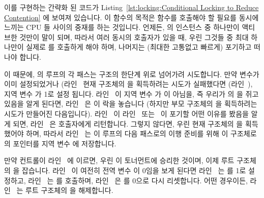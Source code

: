 이를 구현하는 간략화 된 코드가
Listing~\ref{lst:locking:Conditional Locking to Reduce Contention} 에 보여져
있습니다.
이 함수의 목적은  함수를 호출해야 할 필요를
동시에 느끼는 CPU 들 사이의 중재를 하는 것입니다.
언제든,  의 인스턴스 중 하나만이 액티브한 것만이
말이 되며, 따라서 여러 동시의 호출자가 있을 때, 우린 그것들 중 최대 하나만이
실제로  를 호출하게 해야 하며, 나머지는 (최대한
고통없고 빠르게) 포기하고 떠나야 합니다.

\begin{fcvref}
이 때문에,  의 루프의 각 패스는 
구조의 한단계 위로 넘어가려 시도합니다.
만약  변수가 이미 설정되었거나 (라인~ 현재
 구조체의  을 획득하려는 시도가 실패했다면
(라인~), 지역 변수  가 1로 설정 됩니다.
라인~ 이 지역 변수  가  이 아님을, 즉
우리가  의  을 쥐고 있음을 알게 된다면,
라인~ 은 이 락을 놓습니다 (하지만 부모  구조체의
 을 획득하려는 시도가 만들어진 다음입니다).
라인~ 이 라인~ 또는~ 이 포기할
어떤 이유를 봤음을 알게 되면, 라인~ 은 호출자에게 리턴합니다.
그렇지 않다면, 우린 현재  구조체의  을 획득했어야
하며, 따라서 라인~ 는 이 루프의 다음 패스로의 이행 준비를 위해 이
구조체로의 포인터를 지역 변수  에 저장합니다.

만약 컨트롤이 라인~ 에 이르면, 우린 이 토너먼트에 승리한
것이며, 이제 루트  구조체의  을 잡습니다.
라인~ 이 여전히 전역 변수  이 0임을 보게
된다면 라인~ 는  를 1로 설정하고,
라인~ 는  를 호출하며,
라인~ 은  를 0으로 다시 리셋합니다.
어떤 경우이든, 라인~ 는 루트  구조체의 
을 해제합니다.
\end{fcvref}

